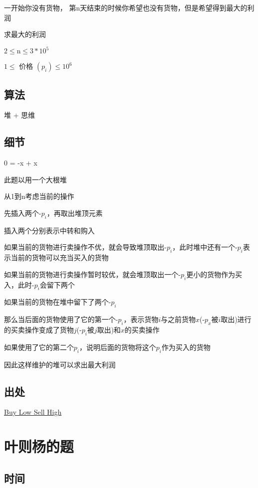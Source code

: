 \documentclass[a4paper]{article}
\begin{document}
		一开始你没有货物，
		第$\text{n}$天结束的时候你希望也没有货物，但是希望得到最大的利润
		
		求最大的利润
		
		$2 \leq \text{n} \leq 3*10^5$
		
		$1 \leq $ 价格 $(p_i)\leq 10^6$
		
	\subsection{算法}
		
		堆 + 思维
		
	\subsection{细节}
		
		0 = -x + x
		
		此题以用一个大根堆
		
		从1到n考虑当前的操作
		
		先插入两个-$p_i$，再取出堆顶元素
		
		插入两个分别表示中转和购入
		
		如果当前的货物进行卖操作不优，就会导致堆顶取出-$p_i$，此时堆中还有一个-$p_i$表示当前的货物可以充当买入的货物
		
		如果当前的货物进行卖操作暂时较优，就会堆顶取出一个-$p_i$更小的货物作为买入，此时-$p_i$会留下两个
		
		如果当前的货物在堆中留下了两个-$p_i$
		
		那么当后面的货物使用了它的第一个-$p_i$，表示货物$i$与之前货物$x$(-$p_x$被$i$取出)进行的买卖操作变成了货物$j$(-$p_i$被$j$取出)和$x$的买卖操作
		
		如果使用了它的第二个$p_i$，说明后面的货物将这个$p_i$作为买入的货物
		
		因此这样维护的堆可以求出最大利润
		
	\subsection{出处}
	
		\href {http://codeforces.com/problemset/problem/865/D}{Buy Low Sell High}
	
	\newpage
	
	\section{叶则杨的题}
	
	\subsection{时间}
		
\end{document}
